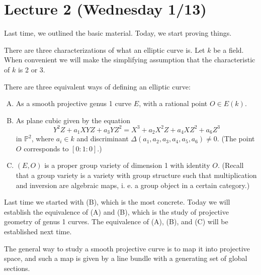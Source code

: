 \section{Lecture 2 (Wednesday 1/13)}
Last time, we outlined the basic material. Today, we start proving things.

There are three characterizations of what an elliptic curve is. Let \( k \) be a field. When convenient we will make the simplifying assumption that the characteristic of \( k \) is 2 or 3.
\begin{proposition}
  There are three equivalent ways of defining an elliptic curve:
  \begin{enumerate}[(A)]
  \item As a smooth projective genus 1 curve \( E \), with a rational point \( O \in E(k) \).
  \item As plane cubic given by the equation \[ Y^2 Z + a_1 XYZ + a_3 YZ^2 = X^3 + a_2 X^2 Z + a_4 XZ^2 + a_6 Z^3 \]
    in \( \mathbb{P}^2 \), where \( a_i \in k \) and discriminant \( \Delta \left( a_1,a_2,a_3,a_4,a_5,a_6 \right) \neq 0 \).
    (The point \( O \) corresponds to \( [0:1:0] \).)
  \item \( (E,O) \) is a proper group variety of dimension 1 with identity \( O \).
    (Recall that a group variety is a variety with group structure such that multiplication and inversion are algebraic maps, i. e. a group object in a certain category.)
  \end{enumerate}
\end{proposition}
Last time we started with (B), which is the most concrete.
Today we will establish the equivalence of (A) and (B), which is the study of projective geometry of genus 1 curves.
The equivalence of (A), (B), and (C) will be established next time.

The general way to study a smooth projective curve is to map it into projective space, and such a map is given by a line bundle with a generating set of global sections.


